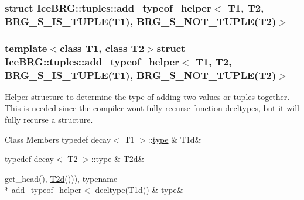 \subsubsection{struct Ice\+B\+R\+G\+:\+:tuples\+:\+:add\+\_\+typeof\+\_\+helper$<$ T1, T2, B\+R\+G\+\_\+\+S\+\_\+\+I\+S\+\_\+\+T\+U\+P\+L\+E(T1), B\+R\+G\+\_\+\+S\+\_\+\+N\+O\+T\+\_\+\+T\+U\+P\+L\+E(T2)$>$}
\subsubsection*{template$<$class T1, class T2$>$struct Ice\+B\+R\+G\+::tuples\+::add\+\_\+typeof\+\_\+helper$<$ T1, T2, B\+R\+G\+\_\+\+S\+\_\+\+I\+S\+\_\+\+T\+U\+P\+L\+E(\+T1), B\+R\+G\+\_\+\+S\+\_\+\+N\+O\+T\+\_\+\+T\+U\+P\+L\+E(\+T2)$>$}

Helper structure to determine the type of adding two values or tuples together. This is needed since the compiler won\textquotesingle{}t fully recurse function decltypes, but it will fully recurse a structure. \begin{DoxyFields}{Class Members}
\hypertarget{namespaceIceBRG_1_1tuples_a12ae66934f161a5bf4f475165542b2f1}{}typedef decay$<$ T1 $>$\+::\hyperlink{namespaceIceBRG_1_1tuples_a15f91e2e79b711689bbaff1a3f697909}{type}\label{namespaceIceBRG_1_1tuples_a12ae66934f161a5bf4f475165542b2f1}
&
T1d&
\\
\hline

\hypertarget{namespaceIceBRG_1_1tuples_a122bf8da284a5c5cf8a0bd39e95bf340}{}typedef decay$<$ T2 $>$\+::\hyperlink{namespaceIceBRG_1_1tuples_a15f91e2e79b711689bbaff1a3f697909}{type}\label{namespaceIceBRG_1_1tuples_a122bf8da284a5c5cf8a0bd39e95bf340}
&
T2d&
\\
\hline

\hypertarget{namespaceIceBRG_1_1tuples_a15f91e2e79b711689bbaff1a3f697909}{}get\+\_\+head(), \hyperlink{namespaceIceBRG_1_1tuples_a122bf8da284a5c5cf8a0bd39e95bf340}{T2d}())), typename \\*
\hyperlink{namespaceIceBRG_1_1tuples_structIceBRG_1_1tuples_1_1add__typeof__helper}{add\+\_\+typeof\+\_\+helper}$<$ decltype(\hyperlink{namespaceIceBRG_1_1tuples_a12ae66934f161a5bf4f475165542b2f1}{T1d}()\label{namespaceIceBRG_1_1tuples_a15f91e2e79b711689bbaff1a3f697909}
&
type&
\\
\hline

\end{DoxyFields}
\label{structIceBRG_1_1tuples_1_1add__typeof__helper_3_01T1_00_01T2_00_01BRG__S__NOT__TUPLE_07T1_08_00_01BRG__S__IS__TUPLE_07T2_08_4}
\hypertarget{namespaceIceBRG_1_1tuples_structIceBRG_1_1tuples_1_1add__typeof__helper_3_01T1_00_01T2_00_01BRG__S__NOT__TUPLE_07T1_08_00_01BRG__S__IS__TUPLE_07T2_08_4}{}
